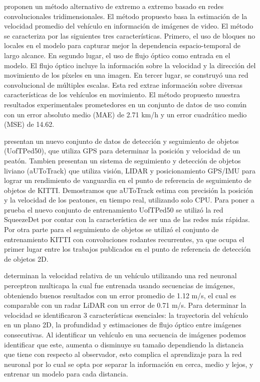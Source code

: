 \citeauthor{dong2019Vehicle} proponen un método alternativo de extremo a extremo basado en redes convolucionales tridimensionales. El método propuesto basa la estimación de la velocidad promedio del vehículo en información de imágenes de video. El método se caracteriza por las siguientes tres características. Primero, el uso de bloques no locales en el modelo para capturar mejor la dependencia espacio-temporal de largo alcance. En segundo lugar, el uso de flujo óptico como entrada en el modelo. El flujo óptico incluye la información sobre la velocidad y la dirección del movimiento de los píxeles en una imagen. En tercer lugar, se construyó una red convolucional de múltiples escalas. Esta red extrae información sobre diversas características de los vehículos en movimiento. El método propuesto muestra resultados experimentales prometedores en un conjunto de datos de uso común con un error absoluto medio (MAE) de 2.71 km/h y un error cuadrático medio (MSE) de 14.62.


\citeauthor{burnett2020aUToTrack} presentan un nuevo conjunto de datos de detección y seguimiento de objetos (UofTPed50), que utiliza GPS para determinar la posición y velocidad de un peatón. Tambien presentan un sistema de seguimiento y detección de objetos liviano (aUToTrack) que utiliza visión, LIDAR y posicionamiento GPS/IMU para lograr un rendimiento de vanguardia en el punto de referencia de seguimiento de objetos de KITTI. Demostramos que aUToTrack estima con precisión la posición y la velocidad de los peatones, en tiempo real, utilizando solo CPU. Para poner a prueba el nuevo conjunto de entrenamiento UofTPed50 se utilizó la red SqueezeDet por contar con la característica de ser una de las redes más rápidas. Por otra parte para el seguimiento de objetos se utilizó el conjunto de entrenamiento KITTI con convoluciones rodantes recurrentes, ya que ocupa el primer lugar entre los trabajos publicados en el punto de referencia de detección de objetos 2D.


\citeauthor{kampelmuhler2018Camera} determinan la velocidad relativa de un vehículo utilizando una red neuronal perceptron multicapa la cual fue entrenada usando secuencias de imágenes, obteniendo buenos resultados con un error promedio de 1.12 m/s, el cual es comparable con un radar  LiDAR con un error de 0.71 m/s. Para determinar la velocidad se identificaron 3 características esenciales: la trayectoria del vehículo en un plano 2D, la profundidad y estimaciones de flujo óptico entre imágenes consecutivas. Al identificar un vehículo en una secuencia de imágenes podemos identificar que este, aumenta o disminuye su tamaño dependiendo la distancia que tiene con respecto al observador, esto complica el aprendizaje para la red neuronal por lo cual se opta por separar la información en cerca, medio y lejos, y entrenar un modelo para cada distancia.


